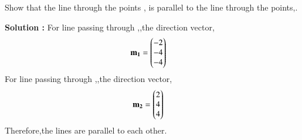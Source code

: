 Show that the line through the points , is parallel to the line through the points,.

\textbf{Solution :}
For line passing through ,,the direction vector,\begin{align}
    \mathbf{m_1}&=\begin{pmatrix}-2\\-4\\-4\end{pmatrix}
\end{align}
For line passing through ,,the direction vector,\begin{align}
    \mathbf{m_2}&=\begin{pmatrix}2\\4\\4\end{pmatrix}
\end{align}
Therefore,the lines are parallel to each other.
